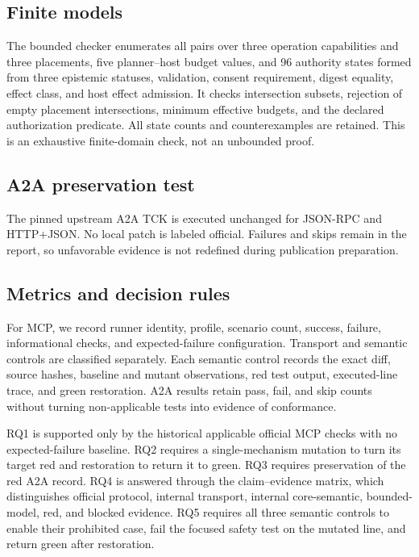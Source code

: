 \subsection{Finite models}
The bounded checker enumerates all pairs over three operation capabilities and three placements, five planner--host budget values, and 96 authority states formed from three epistemic statuses, validation, consent requirement, digest equality, effect class, and host effect admission. It checks intersection subsets, rejection of empty placement intersections, minimum effective budgets, and the declared authorization predicate. All state counts and counterexamples are retained. This is an exhaustive finite-domain check, not an unbounded proof.

\subsection{A2A preservation test}
The pinned upstream A2A TCK is executed unchanged for JSON-RPC and HTTP+JSON. No local patch is labeled official. Failures and skips remain in the report, so unfavorable evidence is not redefined during publication preparation.

\subsection{Metrics and decision rules}
For MCP, we record runner identity, profile, scenario count, success, failure, informational checks, and expected-failure configuration. Transport and semantic controls are classified separately. Each semantic control records the exact diff, source hashes, baseline and mutant observations, red test output, executed-line trace, and green restoration. A2A results retain pass, fail, and skip counts without turning non-applicable tests into evidence of conformance.

RQ1 is supported only by the historical applicable official MCP checks with no expected-failure baseline. RQ2 requires a single-mechanism mutation to turn its target red and restoration to return it to green. RQ3 requires preservation of the red A2A record. RQ4 is answered through the claim--evidence matrix, which distinguishes official protocol, internal transport, internal core-semantic, bounded-model, red, and blocked evidence. RQ5 requires all three semantic controls to enable their prohibited case, fail the focused safety test on the mutated line, and return green after restoration.
